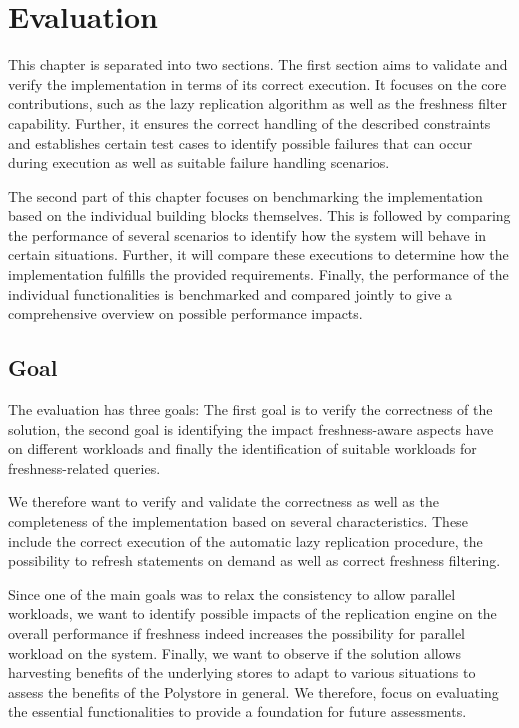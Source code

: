 \chapter{Evaluation}
\label{c:evaluation}

This chapter is separated into two sections. The first section aims to validate and verify the implementation in terms of its
correct execution. It focuses on the core contributions, such as the lazy replication algorithm as well as the freshness filter capability.
Further, it ensures the correct handling of the described constraints and establishes certain test cases to identify possible failures that can occur 
during execution as well as suitable failure handling scenarios.

The second part of this chapter focuses on benchmarking the implementation based on the individual building blocks themselves.
This is followed by comparing the performance of several scenarios to identify how the system will behave in certain situations.
Further, it will compare these executions to determine how the implementation fulfills the provided requirements.
Finally, the performance of the individual functionalities is benchmarked and compared jointly to give a comprehensive overview on possible performance impacts.


\section{Goal}
The evaluation has three goals: The first goal is to verify the correctness of the solution, the second goal
is identifying the impact freshness-aware aspects have on different workloads and finally the identification of suitable workloads for freshness-related queries.

We therefore want to verify and validate the correctness as well as the completeness of the implementation based on several characteristics.
These include the correct execution of the automatic lazy replication procedure, the possibility to refresh statements on demand as well as correct freshness filtering.

Since one of the main goals was to relax the consistency to allow parallel workloads,
we want to identify possible impacts of the replication engine on the overall performance if freshness indeed increases the possibility
for parallel workload on the system. 
Finally, we want to observe if the solution allows harvesting benefits of the underlying stores to adapt to various situations
to assess the benefits of the Polystore in general.
We therefore, focus on evaluating the essential functionalities to provide a foundation for future assessments.


